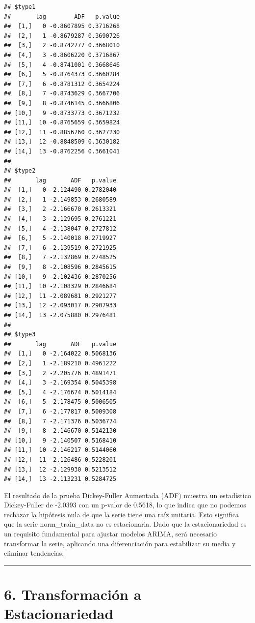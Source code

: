 \documentclass[
]{book}
\begin{document}
\begin{verbatim}
## $type1
##       lag        ADF   p.value
##  [1,]   0 -0.8607895 0.3716268
##  [2,]   1 -0.8679287 0.3690726
##  [3,]   2 -0.8742777 0.3668010
##  [4,]   3 -0.8606220 0.3716867
##  [5,]   4 -0.8741001 0.3668646
##  [6,]   5 -0.8764373 0.3660284
##  [7,]   6 -0.8781312 0.3654224
##  [8,]   7 -0.8743629 0.3667706
##  [9,]   8 -0.8746145 0.3666806
## [10,]   9 -0.8733773 0.3671232
## [11,]  10 -0.8765659 0.3659824
## [12,]  11 -0.8856760 0.3627230
## [13,]  12 -0.8848509 0.3630182
## [14,]  13 -0.8762256 0.3661041
## 
## $type2
##       lag       ADF   p.value
##  [1,]   0 -2.124490 0.2782040
##  [2,]   1 -2.149853 0.2680589
##  [3,]   2 -2.166670 0.2613321
##  [4,]   3 -2.129695 0.2761221
##  [5,]   4 -2.138047 0.2727812
##  [6,]   5 -2.140018 0.2719927
##  [7,]   6 -2.139519 0.2721925
##  [8,]   7 -2.132869 0.2748525
##  [9,]   8 -2.108596 0.2845615
## [10,]   9 -2.102436 0.2870256
## [11,]  10 -2.108329 0.2846684
## [12,]  11 -2.089681 0.2921277
## [13,]  12 -2.093017 0.2907933
## [14,]  13 -2.075880 0.2976481
## 
## $type3
##       lag       ADF   p.value
##  [1,]   0 -2.164022 0.5068136
##  [2,]   1 -2.189210 0.4961222
##  [3,]   2 -2.205776 0.4891471
##  [4,]   3 -2.169354 0.5045398
##  [5,]   4 -2.176674 0.5014184
##  [6,]   5 -2.178475 0.5006505
##  [7,]   6 -2.177817 0.5009308
##  [8,]   7 -2.171376 0.5036774
##  [9,]   8 -2.146670 0.5142130
## [10,]   9 -2.140507 0.5168410
## [11,]  10 -2.146217 0.5144060
## [12,]  11 -2.126486 0.5228201
## [13,]  12 -2.129930 0.5213512
## [14,]  13 -2.113231 0.5284725
\end{verbatim}

El resultado de la prueba Dickey-Fuller Aumentada (ADF) muestra un estadístico Dickey-Fuller de -2.0393 con un p-valor de 0.5618, lo que indica que no podemos rechazar la hipótesis nula de que la serie tiene una raíz unitaria. Esto significa que la serie norm\_train\_data no es estacionaria. Dado que la estacionariedad es un requisito fundamental para ajustar modelos ARIMA, será necesario transformar la serie, aplicando una diferenciación para estabilizar su media y eliminar tendencias.

\begin{center}\rule{0.5\linewidth}{0.5pt}\end{center}

\section{6. Transformación a Estacionariedad}\label{transformaciuxf3n-a-estacionariedad}
\end{document}
